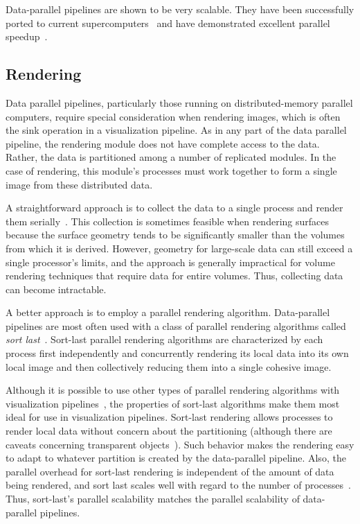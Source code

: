 \documentclass[journal,twocolumn,10pt,letterpaper,twoside]{IEEEtran}
\newcommand*{\lcite}[1]{~\cite{#1}}
\newcommand*{\keyterm}[1]{\emph{#1}}
\newcommand{\fix}[1]{}
\begin{document}
Data-parallel pipelines are shown to be very scalable.  They have been
successfully ported to current
supercomputers\lcite{Moreland2008:CUG,Pugmire2008,Patchett2009} and have
demonstrated excellent parallel speedup\lcite{Childs2010}.

\fix{The Gordon Bell submission will be a good reference here once it is
  published.}

\subsection{Rendering}
\label{sec:ParallelExecution:Rendering}

Data parallel pipelines, particularly those running on distributed-memory
parallel computers, require special consideration when rendering images,
which is often the sink operation in a visualization pipeline.  As in any
part of the data parallel pipeline, the rendering module does not have
complete access to the data.  Rather, the data is partitioned among a
number of replicated modules.  In the case of rendering, this
module's processes must work together to form a single image from these
distributed data.

A straightforward approach is to collect the data to a single process and
render them serially\lcite{Miller1998,Johnson1999}.  This collection is
sometimes feasible when rendering surfaces because the surface geometry
tends to be significantly smaller than the volumes from which it is
derived.  However, geometry for large-scale data can still exceed a single
processor's limits, and the approach is generally impractical for volume
rendering techniques that require data for entire volumes.  Thus,
collecting data can become intractable.

A better approach is to employ a parallel rendering algorithm.
Data-parallel pipelines are most often used with a class of parallel
rendering algorithms called \keyterm{sort last}\lcite{Molnar1994}.
Sort-last parallel rendering algorithms are characterized by each process
first independently and concurrently rendering its local data into its own
local image and then collectively reducing them
into a single cohesive image.

Although it is possible to use other types of parallel rendering algorithms
with visualization pipelines\lcite{Moreland2003}, the properties of
sort-last algorithms make them most ideal for use in visualization
pipelines.  Sort-last rendering allows processes to render local data
without concern about the partitioning (although there are caveats
concerning transparent objects\lcite{Moreland2007}).  Such behavior makes
the rendering easy to adapt to whatever partition is created by the
data-parallel pipeline.  Also, the parallel overhead for sort-last
rendering is independent of the amount of data being rendered, and sort
last scales well with regard to the number of processes\lcite{Wylie2001}.
Thus, sort-last's parallel scalability matches the parallel scalability of
data-parallel pipelines.
\end{document}
